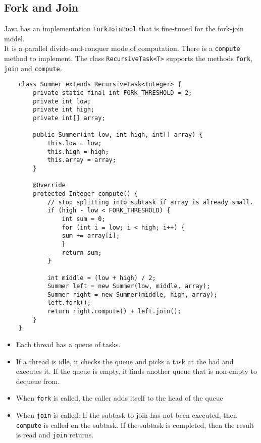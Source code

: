 \documentclass[10pt,landscape,a4paper]{article}
\begin{document}
\begin{multicols*}{4}
\section{Fork and Join}
Java has an implementation \texttt{ForkJoinPool} that is fine-tuned for the fork-join model. \\
It is a parallel divide-and-conquer mode of computation. There is a \texttt{compute} method to implement. The class \texttt{RecursiveTask<T>} supports the methods \texttt{fork}, \texttt{join} and \texttt{compute}.
\begin{lstlisting}
    class Summer extends RecursiveTask<Integer> {
        private static final int FORK_THRESHOLD = 2;
        private int low;
        private int high;
        private int[] array;

        public Summer(int low, int high, int[] array) {
            this.low = low;
            this.high = high;
            this.array = array;
        }

        @Override
        protected Integer compute() {
            // stop splitting into subtask if array is already small.
            if (high - low < FORK_THRESHOLD) {
                int sum = 0;
                for (int i = low; i < high; i++) {
                sum += array[i];
                }
                return sum;
            }   

            int middle = (low + high) / 2;
            Summer left = new Summer(low, middle, array);
            Summer right = new Summer(middle, high, array);
            left.fork();
            return right.compute() + left.join();
        }
    }
\end{lstlisting}
\begin{itemize}
    \item Each thread has a queue of tasks.
    \item If a thread is idle, it checks the queue and picks a task at the had and executes it. If the queue is empty, it finds another queue that is non-empty to dequeue from.
    \item When \texttt{fork} is called, the caller adds itself to the head of the queue 
    \item When \texttt{join} is called:
        \subitem If the subtask to join has not been executed, then \texttt{compute} is called on the subtask.
        \subitem If the subtask is completed, then the result is read and \texttt{join} returns.
\end{itemize}


\end{multicols*}
\end{document}

